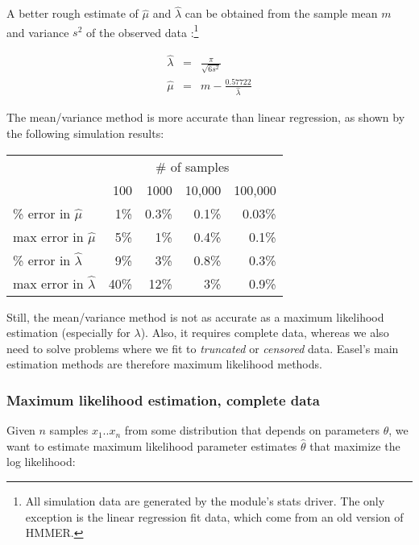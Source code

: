 A better rough estimate of $\hat{\mu}$ and $\hat{\lambda}$ can be
obtained from the sample mean $m$ and variance $s^2$ of the observed
data \citep{Evans00}:\footnote{All simulation data are generated by
the  module's stats driver. The only exception is the
linear regression fit data, which come from an old version of HMMER.}

\begin{eqnarray*}
  \hat{\lambda} & = & \frac{\pi}{\sqrt{6s^2}}\\
  \hat{\mu}     & = & m - \frac{0.57722}{\hat{\lambda}}
\end{eqnarray*}

The mean/variance method is more accurate than linear regression, as
shown by the following simulation results:

\begin{center}
\begin{tabular}{lrrrr} \hline
                              & \multicolumn{4}{c}{\# of samples}\\
                              & 100 & 1000  & 10,000 & 100,000 \\
\% error in $\hat{\mu}$       &  1\%& 0.3\% &  0.1\% & 0.03\%  \\
max error in $\hat{\mu}$      &  5\%&   1\% &  0.4\% &  0.1\%  \\
\% error in $\hat{\lambda}$   &  9\%&   3\% &  0.8\% &  0.3\%  \\
max error in $\hat{\lambda}$  & 40\%&  12\% &    3\% &  0.9\%  \\ \hline
\end{tabular}
\end{center}

Still, the mean/variance method is not as accurate as a maximum
likelihood estimation (especially for $\lambda$). Also, it requires
complete data, whereas we also need to solve problems where we fit to
\emph{truncated} or \emph{censored} data. Easel's main estimation
methods are therefore maximum likelihood methods.

\subsubsection{Maximum likelihood estimation, complete data}

Given $n$ samples $x_1..x_n$ from some distribution that depends on
parameters $\theta$, we want to estimate maximum likelihood parameter
estimates $\hat{\theta}$ that maximize the log likelihood:

